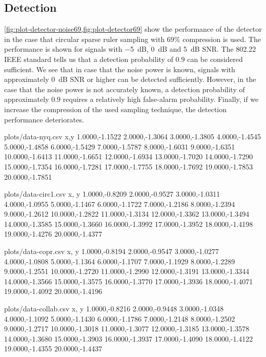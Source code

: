 \documentclass[a4paper, openany, oneside]{memoir}
\begin{document}
\subsection{Detection}
\cref{fig:plot-detector-noise69,fig:plot-detector69} show the performance of the detector in the case that circular sparse ruler sampling with $69\%$ compression is used. The performance is shown for signals with \SI{-5}{dB}, \SI{0}{dB} and \SI{5}{dB} SNR. The 802.22 IEEE standard tells us that a detection probability of $0.9$ can be considered sufficient. We see that in case that the noise power is known, signals with approximately \SI{0}{dB} SNR or higher can be detected sufficiently. However, in the case that the noise power is not accurately known, a detection probability of approximately $0.9$ requires a relatively high false-alarm probability. Finally, if we increase the compression of the used sampling technique, the detection performance deteriorates.

\begin{filecontents*}{plots/data-nyq.csv}
x,y
1.0000,-1.1522
2.0000,-1.3064
3.0000,-1.3805
4.0000,-1.4545
5.0000,-1.4858
6.0000,-1.5429
7.0000,-1.5787
8.0000,-1.6031
9.0000,-1.6351
10.0000,-1.6413
11.0000,-1.6651
12.0000,-1.6934
13.0000,-1.7020
14.0000,-1.7290
15.0000,-1.7354
16.0000,-1.7281
17.0000,-1.7755
18.0000,-1.7692
19.0000,-1.7853
20.0000,-1.7851
\end{filecontents*}

\begin{filecontents*}{plots/data-circ1.csv}
x, y
1.0000,-0.8209
2.0000,-0.9527
3.0000,-1.0311
4.0000,-1.0955
5.0000,-1.1467
6.0000,-1.1722
7.0000,-1.2186
8.0000,-1.2394
9.0000,-1.2612
10.0000,-1.2822
11.0000,-1.3134
12.0000,-1.3362
13.0000,-1.3494
14.0000,-1.3585
15.0000,-1.3660
16.0000,-1.3992
17.0000,-1.3952
18.0000,-1.4198
19.0000,-1.4276
20.0000,-1.4377
\end{filecontents*}


\begin{filecontents*}{plots/data-copr.csv}
x, y
1.0000,-0.8194
2.0000,-0.9547
3.0000,-1.0277
4.0000,-1.0808
5.0000,-1.1364
6.0000,-1.1707
7.0000,-1.1929
8.0000,-1.2289
9.0000,-1.2551
10.0000,-1.2720
11.0000,-1.2990
12.0000,-1.3191
13.0000,-1.3344
14.0000,-1.3566
15.0000,-1.3575
16.0000,-1.3770
17.0000,-1.3936
18.0000,-1.4071
19.0000,-1.4092
20.0000,-1.4196
\end{filecontents*}

\begin{filecontents*}{plots/data-collab.csv}
x, y
1.0000,-0.8216
2.0000,-0.9448
3.0000,-1.0348
4.0000,-1.1092
5.0000,-1.1430
6.0000,-1.1786
7.0000,-1.2148
8.0000,-1.2502
9.0000,-1.2717
10.0000,-1.3018
11.0000,-1.3077
12.0000,-1.3185
13.0000,-1.3578
14.0000,-1.3680
15.0000,-1.3903
16.0000,-1.3937
17.0000,-1.4090
18.0000,-1.4122
19.0000,-1.4355
20.0000,-1.4437
\end{filecontents*}
\end{document}

